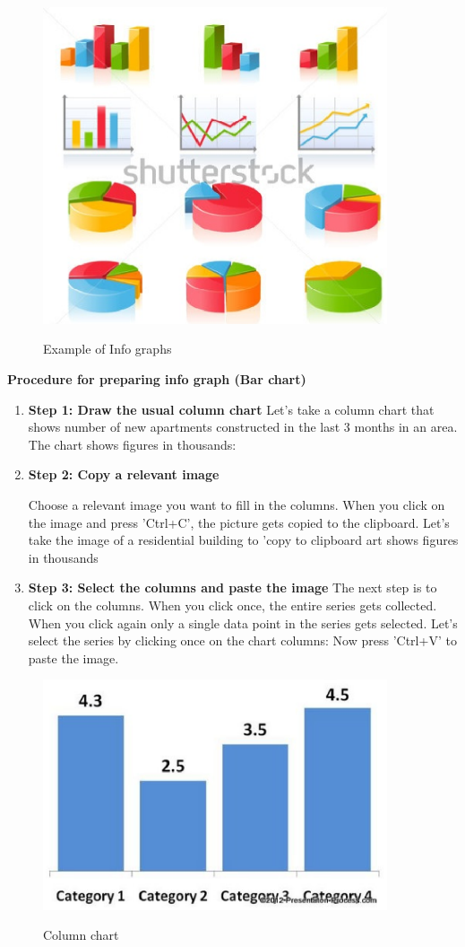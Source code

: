 \begin{figure}
  \includegraphics[width=4in]{figure1.eps} \cite  { Stephen Moffat}
  \caption {Example of Info graphs}\label{2.1} 
\end{figure} 
\textbf{Procedure for preparing info graph (Bar chart)}
\begin{enumerate}
  \item \textbf{Step 1: Draw the usual column chart}
  Let's take a column chart that shows number of new apartments constructed in the last 3 months in an area. The chart shows figures in thousands:
  \item \textbf{Step 2: Copy a relevant image}

 Choose a relevant image you want to fill in the columns. When you click on the image and press 'Ctrl+C', the picture gets copied to the clipboard. Let's take the image of a residential building to 'copy to clipboard art shows figures in thousands
  \item \textbf{Step 3: Select the columns and paste the image}
The next step is to click on the columns. When you click once, the entire series gets collected. When you click again only a single data point in the series gets selected. Let's select the series by clicking once on the chart columns:
Now press 'Ctrl+V' to paste the image.
\end{enumerate}


\begin{figure}
  \includegraphics[width=4in]{figure2.eps} \cite {  Negriono}
  \caption {Column  chart}\label{3.2}
\end{figure}




